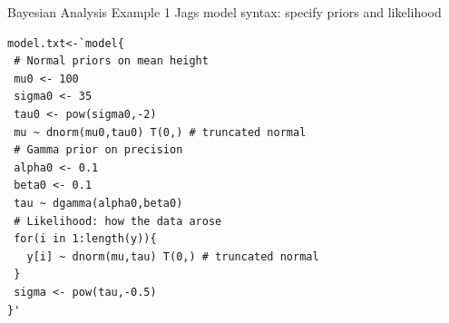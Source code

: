 \documentclass[presentation,9pt,xcolor=dvipsnames]{beamer}
\begin{document}
\begin{frame}[fragile,label={sec:org12dd069}]{Bayesian Analysis Example 1}
 Jags model syntax: specify priors and likelihood \\
\begin{verbatim}
model.txt<-`model{
 # Normal priors on mean height
 mu0 <- 100 
 sigma0 <- 35
 tau0 <- pow(sigma0,-2)
 mu ~ dnorm(mu0,tau0) T(0,) # truncated normal
 # Gamma prior on precision
 alpha0 <- 0.1
 beta0 <- 0.1
 tau ~ dgamma(alpha0,beta0)
 # Likelihood: how the data arose
 for(i in 1:length(y)){
   y[i] ~ dnorm(mu,tau) T(0,) # truncated normal
 }
 sigma <- pow(tau,-0.5)
}'
\end{verbatim}
\end{frame}
\end{document}
